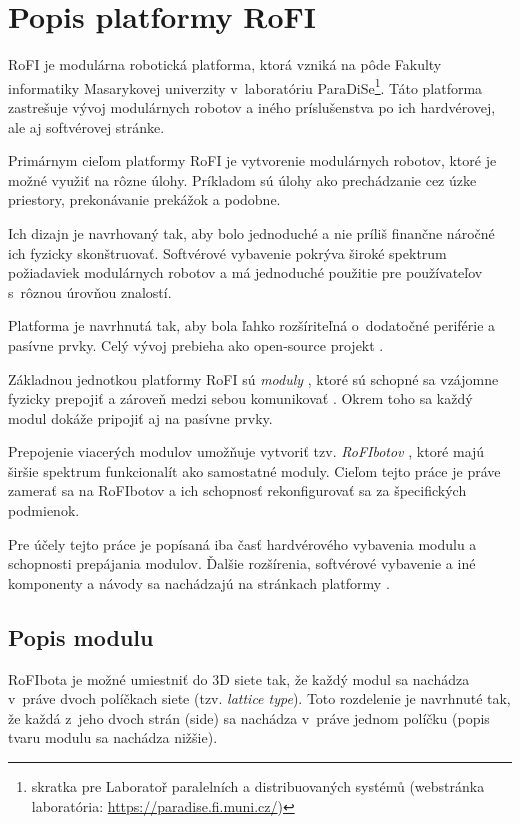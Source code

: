 \documentclass[
  printed, %
  oneside, %
  notable,   %
  nolof,     %
  nolot,     %
]{fithesis3}
\begin{document}
\chapter{Popis platformy RoFI}
\label{sec:platform}
RoFI je modulárna robotická platforma, ktorá vzniká na pôde Fakulty informatiky Masarykovej univerzity v~laboratóriu ParaDiSe\footnote{skratka pre Laboratoř paralelních a distribuovaných systémů (webstránka laboratória: \url{https://paradise.fi.muni.cz/})}. Táto platforma zastrešuje vývoj modulárnych robotov a iného príslušenstva po ich hardvérovej, ale aj softvérovej stránke. 

Primárnym cieľom platformy RoFI je vytvorenie modulárnych robotov, ktoré je možné využiť na rôzne úlohy. Príkladom sú úlohy ako prechádzanie cez úzke priestory, prekonávanie prekážok a podobne. 

Ich dizajn je navrhovaný tak, aby bolo jednoduché a nie príliš finančne náročné ich fyzicky skonštruovať. Softvérové vybavenie pokrýva široké spektrum požiadaviek modulárnych robotov a má jednoduché použitie pre používateľov s~rôznou úrovňou znalostí. 

Platforma je navrhnutá tak, aby bola ľahko rozšíriteľná o~dodatočné periférie a pasívne prvky. Celý vývoj prebieha ako open-source projekt \cite{rofiGit}. 

Základnou jednotkou platformy RoFI sú \textit{moduly} \cite{mrazekMasterThesis}, ktoré sú schopné sa vzájomne fyzicky prepojiť a zároveň medzi sebou komunikovať \cite{rofiCom}. Okrem toho sa každý modul dokáže pripojiť aj na pasívne prvky. 

Prepojenie viacerých modulov umožňuje vytvoriť tzv. \textit{RoFIbotov} \cite{rofiWeb}, ktoré majú širšie spektrum funkcionalít ako samostatné moduly. Cieľom tejto práce je práve zamerať sa na RoFIbotov a ich schopnosť rekonfigurovať sa za špecifických podmienok. 

Pre účely tejto práce je popísaná iba časť hardvérového vybavenia modulu a schopnosti prepájania modulov. Ďalšie rozšírenia, softvérové vybavenie a iné komponenty a návody sa nachádzajú na stránkach platformy \cite{rofiWeb}.

\section{Popis modulu}
\label{sec:moduleSpec}
RoFIbota je možné umiestniť do 3D siete tak, že každý modul sa nachádza v~práve dvoch políčkach siete (tzv. \textit{lattice type}). Toto rozdelenie je navrhnuté tak, že každá z~jeho dvoch strán (side) sa nachádza v~práve jednom políčku (popis tvaru modulu sa nachádza nižšie). 
\end{document}
